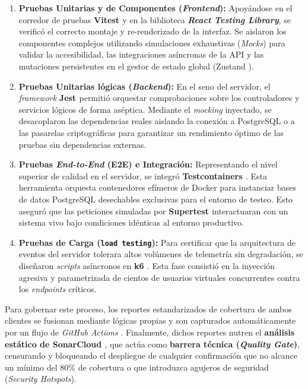\begin{enumerate}
    \item \textbf{Pruebas Unitarias y de Componentes (\textit{Frontend}):} Apoyándose en el corredor de pruebas \textbf{Vitest \cite{vitest}} y en la biblioteca \textbf{\textit{React \cite{react} Testing Library}}, se verificó el correcto montaje y re-renderizado de la interfaz. Se aislaron los componentes complejos utilizando simulaciones exhaustivas (\textit{Mocks}) para validar la accesibilidad, las integraciones asíncronas de la API y las mutaciones persistentes en el gestor de estado global (Zustand \cite{zustand}).
    \item \textbf{Pruebas Unitarias lógicas (\textit{Backend}):} En el seno del servidor, el \textit{framework} \textbf{Jest \cite{jest}} permitió orquestar comprobaciones sobre los controladores y servicios lógicos de forma aséptica. Mediante el \textit{mocking} inyectado, se desacoplaron las dependencias reales aislando la conexión a PostgreSQL \cite{postgresql} o a las pasarelas criptográficas para garantizar un rendimiento óptimo de las pruebas sin dependencias externas.
    \item \textbf{Pruebas \textit{End-to-End} (E2E) e Integración:} Representando el nivel superior de calidad en el servidor, se integró \textbf{Testcontainers \cite{testcontainers}}. Esta herramienta orquesta contenedores efímeros de Docker \cite{docker} para instanciar bases de datos PostgreSQL \cite{postgresql} desechables exclusivas para el entorno de testeo. Esto aseguró que las peticiones simuladas por \textbf{Supertest \cite{supertest}} interactuaran con un sistema vivo bajo condiciones idénticas al entorno productivo.
    \item \textbf{Pruebas de Carga (\texttt{load testing}):} Para certificar que la arquitectura de eventos del servidor tolerara altos volúmenes de telemetría sin degradación, se diseñaron \textit{scripts} asíncronos en \textbf{k6 \cite{k6}}. Esta fase consistió en la inyección agresiva y parametrizada de cientos de usuarios virtuales concurrentes contra los \textit{endpoints} críticos.
\end{enumerate}

Para gobernar este proceso, los reportes estandarizados de cobertura de ambos clientes se fusionan mediante lógicas propias y son capturados automáticamente por un flujo de \textit{GitHub Actions} \cite{githubactions}. Finalmente, dichos reportes nutren el \textbf{análisis estático de SonarCloud \cite{sonarqube}}, que actúa como \textbf{barrera técnica (\textit{Quality Gate})}, censurando y bloqueando el despliegue de cualquier confirmación que no alcance un mínimo del $80\%$ de cobertura o que introduzca agujeros de seguridad (\textit{Security Hotspots}).


